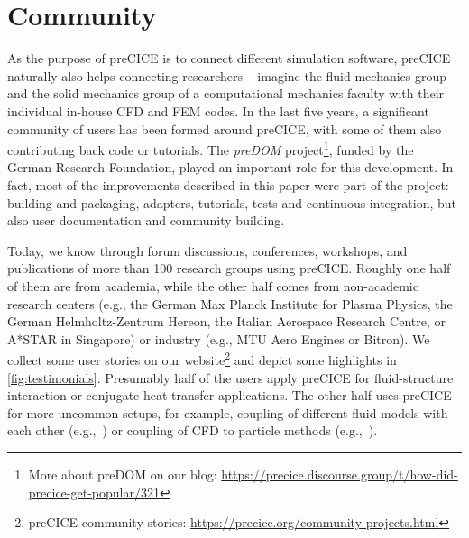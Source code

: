 \section{Community} 
\label{sec:community}

As the purpose of preCICE is to connect different simulation software, preCICE naturally also helps connecting researchers -- imagine the fluid mechanics group and the solid mechanics group of a computational mechanics faculty with their individual in-house CFD and FEM codes.
In the last five years, a significant community of users has been formed around preCICE, with some of them also contributing back code or tutorials. The \textit{preDOM} project\footnote{More about preDOM on our blog: \url{https://precice.discourse.group/t/how-did-precice-get-popular/321}}, funded by the German Research Foundation, played an important role for this development. In fact, most of the improvements described in this paper were part of the project: building and packaging, adapters, tutorials, tests and continuous integration, but also user documentation and community building.   

Today, we know through forum discussions, conferences, workshops, and publications of more than 100 research groups using preCICE. Roughly one half of them are from academia, while the other half comes from non-academic research centers (e.g., the German Max Planck Institute for Plasma Physics, the German Helmholtz-Zentrum Hereon, the Italian Aerospace Research Centre, or A*STAR in Singapore) or industry (e.g., MTU Aero Engines or Bitron).   
We collect some user stories on our website\footnote{preCICE community stories: \url{https://precice.org/community-projects.html}}
and depict some highlights in \autoref{fig:testimonials}.
Presumably half of the users apply preCICE for fluid-structure interaction or conjugate heat transfer applications. The other half uses preCICE for more uncommon setups, for example, coupling of different fluid models with each other (e.g.,~\cite{revell2020coupled}) or coupling of CFD to particle methods (e.g.,~\cite{besseron2021eulerian}). 

